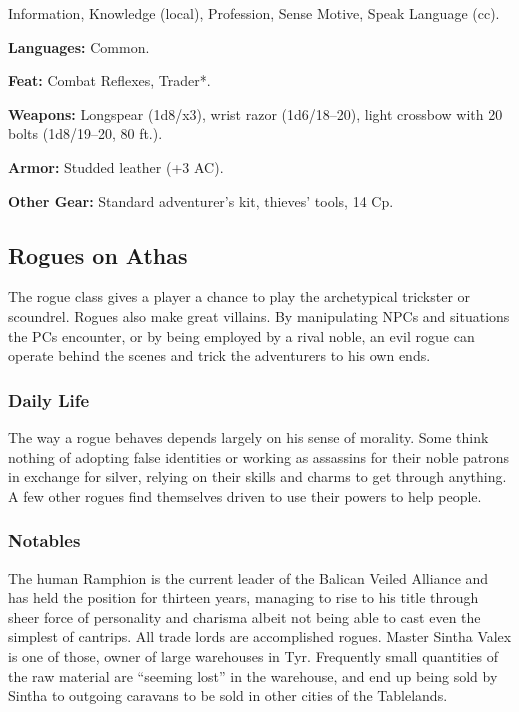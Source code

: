 Information, Knowledge (local), Profession, Sense Motive, Speak Language (cc).

\textbf{Languages:} Common.

\textbf{Feat:} Combat Reflexes, Trader*.

\textbf{Weapons:} Longspear (1d8/x3), wrist razor (1d6/18–20), light crossbow with 20 bolts (1d8/19–20, 80 ft.).

\textbf{Armor:} Studded leather (+3 AC).

\textbf{Other Gear:} Standard adventurer's kit, thieves' tools, 14 Cp.

\subsection{Rogues on Athas}

The rogue class gives a player a chance to play the archetypical trickster or scoundrel. Rogues also make great villains. By manipulating NPCs and situations the PCs encounter, or by being employed by a rival noble, an evil rogue can operate behind the scenes and trick the adventurers to his own ends.

\subsubsection{Daily Life}
The way a rogue behaves depends largely on his sense of morality. Some think nothing of adopting false identities or working as assassins for their noble patrons in exchange for silver, relying on their skills and charms to get through anything. A few other rogues find themselves driven to use their powers to help people.

\subsubsection{Notables}
The human Ramphion is the current leader of the Balican Veiled Alliance and has held the position for thirteen years, managing to rise to his title through sheer force of personality and charisma albeit not being able to cast even the simplest of cantrips. All trade lords are accomplished rogues. Master Sintha Valex is one of those, owner of large warehouses in Tyr. Frequently small quantities of the raw material are ``seeming lost'' in the warehouse, and end up being sold by Sintha to outgoing caravans to be sold in other cities of the Tablelands.

